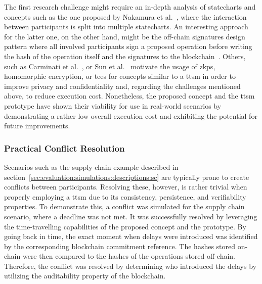 The first research challenge might require an in-depth analysis of statecharts and concepts such as the one proposed by Nakamura et al.~\cite{inter_organizational_bps_managed_by_blockchain}, where the interaction between participants is split into multiple statecharts. An interesting approach for the latter one, on the other hand, might be the off-chain signatures design pattern where all involved participants sign a proposed operation before writing the hash of the operation itself and the signatures to the blockchain~\cite{eberhardt17off_block,weber2019_architecture_for_dapps_blockchain_patterns}. Others, such as Carminati et al.~\cite{blockchain_for_secure_io_bp}, or Sun et al.~\cite{sun2021_survey_of_zkp_on_blockchain} motivate the usage of \glspl{zkp}, homomorphic encryption, or \glspl{tee} for concepts similar to a \gls{ttsm} in order to improve privacy and confidentiality and, regarding the challenges mentioned above, to reduce execution cost. Nonetheless, the proposed concept and the \gls{ttsm} prototype have shown their viability for use in real-world scenarios by demonstrating a rather low overall execution cost and exhibiting the potential for future improvements.

\subsubsection{Practical Conflict Resolution}
\label{sec:evaluation:simulations:conflict_resolution}
Scenarios such as the supply chain example described in section~\ref{sec:evaluation:simulations:descriptions:sc} are typically prone to create conflicts between participants. Resolving these, however, is rather trivial when properly employing a \gls{ttsm} due to its consistency, persistence, and verifiability properties. To demonstrate this, a conflict was simulated for the supply chain scenario, where a deadline was not met. It was successfully resolved by leveraging the time-travelling capabilities of the proposed concept and the prototype. By going back in time, the exact moment when delays were introduced was identified by the corresponding blockchain commitment reference. The hashes stored on-chain were then compared to the hashes of the operations stored off-chain. Therefore, the conflict was resolved by determining who introduced the delays by utilizing the auditability property of the blockchain.

